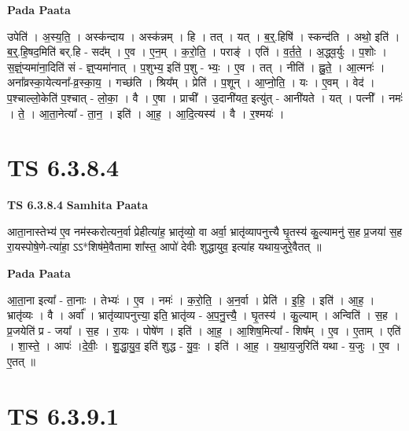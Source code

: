 \documentclass[17pt]{extarticle}
\begin{document}
\textbf{Pada Paata} \newline

उपेति॑ । अ॒स्य॒ति॒ । अस्क॑न्दाय । अस्क॑न्नम् । हि । तत् । यत् । ब॒र्॒.हिषि॑ । स्कन्द॑ति । अथो॒ इति॑ । ब॒र्॒.हि॒षद॒मिति॑ बर्.हि - सद᳚म् । ए॒व । ए॒न॒म् । क॒रो॒ति॒ । पराङ्॑ । एति॑ । व॒र्त॒ते॒ । अ॒द्ध्व॒र्युः । प॒शोः । स॒ज्ञ्ं॒प्यमा॑ना॒दिति॑ सं - ज्ञ्॒प्यमा॑नात् । प॒शुभ्य॒ इति॑ प॒शु - भ्यः॒ । ए॒व । तत् । नीति॑ । ह्नु॒ते॒ । आ॒त्मनः॑ । अना᳚व्रस्का॒येत्यना᳚-व्र॒स्का॒य॒ । गच्छ॑ति । श्रिय᳚म् । प्रेति॑ । प॒शून् । आ॒प्नो॒ति॒ । यः । ए॒वम् । वेद॑ । प॒श्चाल्लो॒केति॑ प॒श्चात् - लो॒का॒ । वै । ए॒षा । प्राची᳚ । उ॒दानी॑यत॒ इत्यु॑त् - आनी॑यते । यत् । पत्नी᳚ । नमः॑ । ते॒ । आ॒ता॒नेत्या᳚ - ता॒न॒ । इति॑ । आ॒ह॒ । आ॒दि॒त्यस्य॑ । वै । र॒श्मयः॑ ।  \newline





\section{ TS 6.3.8.4 }

\textbf{TS 6.3.8.4 } \newline
\textbf{Samhita Paata} \newline

आता॒नास्तेभ्य॑ ए॒व नम॑स्करोत्यन॒र्वा प्रेहीत्या॑ह॒ भ्रातृ॑व्यो॒ वा अर्वा॒ भ्रातृ॑व्यापनुत्त्यै घृ॒तस्य॑ कु॒ल्यामनु॑ स॒ह प्र॒जया॑ स॒ह रा॒यस्पोषे॒णे-त्या॑हा॒ ऽऽ*शिष॑मे॒वैतामा शा᳚स्त॒ आपो॑ देवीः शुद्धायुव॒ इत्या॑ह यथाय॒जुरे॒वैतत् ॥ \newline

\textbf{Pada Paata} \newline

आ॒ता॒ना इत्या᳚ - ता॒नाः । तेभ्यः॑ । ए॒व । नमः॑ । क॒रो॒ति॒ । अ॒न॒र्वा । प्रेति॑ । इ॒हि॒ । इति॑ । आ॒ह॒ । भ्रातृ॑व्यः । वै । अर्वा᳚ । भ्रातृ॑व्यापनुत्त्या॒ इति॒ भ्रातृ॑व्य - अ॒प॒नु॒त्त्यै॒ । घृ॒तस्य॑ । कु॒ल्याम् । अन्विति॑ । स॒ह । प्र॒जयेति॑ प्र - जया᳚ । स॒ह । रा॒यः । पोषे॑ण । इति॑ । आ॒ह॒ । आ॒शिष॒मित्या᳚ - शिष᳚म् । ए॒व । ए॒ताम् । एति॑ । शा॒स्ते॒ । आपः॑ ।दे॒वीः॒ । शु॒द्धा॒यु॒व॒ इति॑ शुद्ध - यु॒वः॒ । इति॑ । आ॒ह॒ । य॒था॒य॒जुरिति॑ यथा - य॒जुः । ए॒व । ए॒तत् ॥  \newline





\section{ TS 6.3.9.1 }
\end{document}
